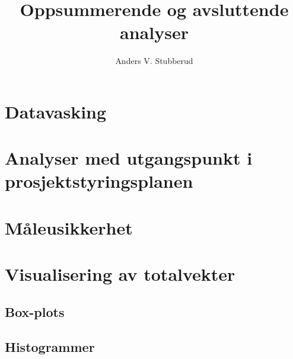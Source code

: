 \documentclass{article}
\begin{document}
\title{Oppsummerende og avsluttende analyser}
\author{Anders V. Stubberud}
\maketitle
\tableofcontents

\newpage
\section{Datavasking}

\section{Analyser med utgangspunkt i prosjektstyringsplanen}

\section{Måleusikkerhet}

\section{Visualisering av totalvekter}
\subsection{Box-plots}

\subsection{Histogrammer}

\end{document}
